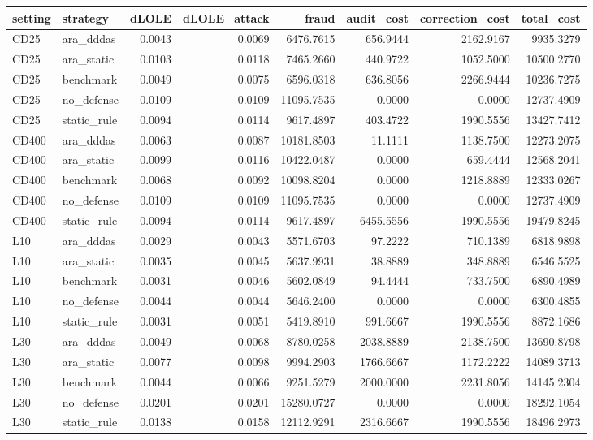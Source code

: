 \begin{tabular}{llrrrrrr}
\toprule
setting & strategy & dLOLE & dLOLE_attack & fraud & audit_cost & correction_cost & total_cost \\
\midrule
CD25 & ara_dddas & 0.0043 & 0.0069 & 6476.7615 & 656.9444 & 2162.9167 & 9935.3279 \\
CD25 & ara_static & 0.0103 & 0.0118 & 7465.2660 & 440.9722 & 1052.5000 & 10500.2770 \\
CD25 & benchmark & 0.0049 & 0.0075 & 6596.0318 & 636.8056 & 2266.9444 & 10236.7275 \\
CD25 & no_defense & 0.0109 & 0.0109 & 11095.7535 & 0.0000 & 0.0000 & 12737.4909 \\
CD25 & static_rule & 0.0094 & 0.0114 & 9617.4897 & 403.4722 & 1990.5556 & 13427.7412 \\
CD400 & ara_dddas & 0.0063 & 0.0087 & 10181.8503 & 11.1111 & 1138.7500 & 12273.2075 \\
CD400 & ara_static & 0.0099 & 0.0116 & 10422.0487 & 0.0000 & 659.4444 & 12568.2041 \\
CD400 & benchmark & 0.0068 & 0.0092 & 10098.8204 & 0.0000 & 1218.8889 & 12333.0267 \\
CD400 & no_defense & 0.0109 & 0.0109 & 11095.7535 & 0.0000 & 0.0000 & 12737.4909 \\
CD400 & static_rule & 0.0094 & 0.0114 & 9617.4897 & 6455.5556 & 1990.5556 & 19479.8245 \\
L10 & ara_dddas & 0.0029 & 0.0043 & 5571.6703 & 97.2222 & 710.1389 & 6818.9898 \\
L10 & ara_static & 0.0035 & 0.0045 & 5637.9931 & 38.8889 & 348.8889 & 6546.5525 \\
L10 & benchmark & 0.0031 & 0.0046 & 5602.0849 & 94.4444 & 733.7500 & 6890.4989 \\
L10 & no_defense & 0.0044 & 0.0044 & 5646.2400 & 0.0000 & 0.0000 & 6300.4855 \\
L10 & static_rule & 0.0031 & 0.0051 & 5419.8910 & 991.6667 & 1990.5556 & 8872.1686 \\
L30 & ara_dddas & 0.0049 & 0.0068 & 8780.0258 & 2038.8889 & 2138.7500 & 13690.8798 \\
L30 & ara_static & 0.0077 & 0.0098 & 9994.2903 & 1766.6667 & 1172.2222 & 14089.3713 \\
L30 & benchmark & 0.0044 & 0.0066 & 9251.5279 & 2000.0000 & 2231.8056 & 14145.2304 \\
L30 & no_defense & 0.0201 & 0.0201 & 15280.0727 & 0.0000 & 0.0000 & 18292.1054 \\
L30 & static_rule & 0.0138 & 0.0158 & 12112.9291 & 2316.6667 & 1990.5556 & 18496.2973 \\

\end{tabular}
